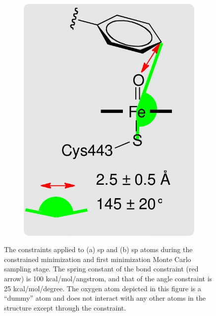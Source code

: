 \begin{figure}
\begin{subfigure}[b]{0.35\textwidth}
\includegraphics[width=\textwidth]{figures/idsite/33b}
\caption{}
\label{figure:first_sp2_constraints}
\end{subfigure}
\caption{The constraints applied to (a) sp and (b) sp atoms during the constrained minimization and first minimization Monte Carlo sampling stage.
The spring constant of the bond constraint (red arrow) is 100 kcal/mol/angstrom, and that of the angle constraint is 25 kcal/mol/degree.
The oxygen atom depicted in this figure is a ``dummy'' atom and does not interact with any other atoms in the structure except through the constraint.}
\label{figure:first_constraints}
\end{figure}
